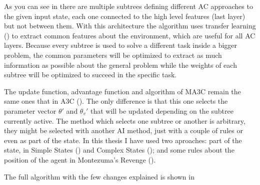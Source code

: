 As you can see in  there are multiple subtrees defining different \acl{AC} approaches to the given input state,
each one connected to the high level features (last layer) but not between them.
With this architecture the algorithm uses transfer learning () to extract common features
about the environment, which are useful for all \ac{AC} layers.
Because every subtree is used to solve a different task inside a bigger problem, the common parameters will be optimized to
extract as much information as possible about the general problem while the weights of each subtree will be optimized to
succeed in the specific task.

The update function, advantage function and algorithm of \ac{MA3C} remain the same ones that in \ac{A3C} ().
The only difference is that this one selects the parameter vector $\theta'$ and $\theta_{v}'$ that will be updated
depending on the subtree currently active.
The method which selects one subtree or another is arbitrary, they might be selected with another \ac{AI} method, just
with a couple of rules or even as part of the state.
In this thesis I have used two aproaches: part of the state, in Simple States () and Complex States
(); and some rules about the position of the agent in Montezuma's Revenge ().

The full algorithm with the few changes explained is shown in 

